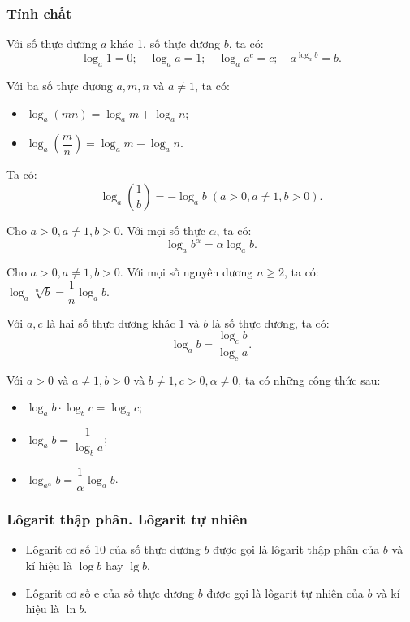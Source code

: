 \begin{tomtat}
	\subsubsection{Tính chất}
	\begin{tc}
		Với số thực dương $a$ khác 1, số thực dương $b$, ta có:
		$$\log _{a} 1=0 ; \quad \log _{a} a=1 ; \quad \log _{a} a^{c}=c ; \quad a^{\log _{a} b}=b.$$
	\end{tc}
	\begin{tc}
		Với ba số thực dương $a, m, n$ và $a \neq 1$, ta có:
		\begin{itemize}
			\item $\log _{a}(m n)=\log _{a} m+\log _{a} n$;
			\item $\log _{a}\left(\dfrac{m}{n}\right)=\log _{a} m-\log _{a} n$. 
		\end{itemize}
	\end{tc}
	\begin{note}
		Ta có:
		$$\log _{a}\left(\frac{1}{b}\right)=-\log _{a} b\; (a>0, a \neq 1, b>0).$$
	\end{note}
	\begin{tc}
		Cho $a>0, a \neq 1, b>0$. Với mọi số thực $\alpha$, ta có:
		$$	\log _a b^\alpha=\alpha \log _a b.	$$
	\end{tc}
	\begin{note}
		Cho $a>0, a \neq 1, b>0$. Với mọi số nguyên dương $n \geq 2$, ta có: $	\log _a \sqrt[n]{b}=\dfrac{1}{n} \log _a b.$
	\end{note}
	\begin{tc}
		Với $a, c$ là hai số thực dương khác 1 và $b$ là số thực dương, ta có:
		$$\log _{a} b=\dfrac{\log _{c} b}{\log _{c} a}.$$
	\end{tc}
	\begin{nx}
		Với $a>0$ và $a \neq 1, b>0$ và $b \neq 1, c>0, \alpha \neq 0$, ta có những công thức sau:
		\begin{itemize}
			\item $\log _{a} b \cdot \log _{b} c=\log _{a} c$;
			\item $\log _{a} b=\dfrac{1}{\log _{b} a}$;
			\item $\log _{a^{\alpha}} b=\dfrac{1}{\alpha} \log _{a} b$.
		\end{itemize}
	\end{nx}
	\subsubsection{Lôgarit thập phân. Lôgarit tự nhiên}
	\begin{itemize}
		\item Lôgarit cơ số 10 của số thực dương $b$ được gọi là lôgarit thập phân của $b$ và kí hiệu là $\log b$ hay $\lg b$.
		\item Lôgarit cơ số $\mathrm{e}$ của số thực dương $b$ được gọi là lôgarit tự nhiên của $b$ và kí hiệu là $\ln b$.
	\end{itemize}

\end{tomtat}
